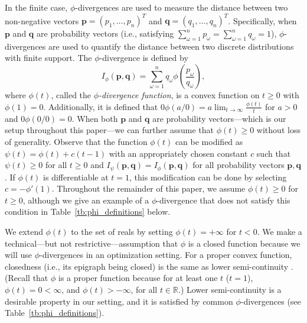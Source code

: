 \documentclass[opre,nonblindrev]{informs3} %
\newcommand{\q}{\mathbf{q}}
\newcommand{\p}{\mathbf{p}}
\begin{document}
In the finite case, $\phi$-divergences are used to measure the distance between two non-negative vectors $\p = (p_1, \dots, p_n)^T$ and $\q = (q_1, \dots, q_n)^T$.
Specifically, when $\p$ and $\q$ are probability vectors (i.e., satisfying $\sum_{\omega=1}^n p_\omega = \sum_{\omega=1}^n q_\omega = 1$), $\phi$-divergences are used to quantify the distance between two discrete distributions with finite support. 
The $\phi$-divergence is defined by
\[
	I_\phi(\p,\q) = \sum_{\omega=1}^n q_\omega \phi\left(\frac{p_\omega}{q_\omega}\right),
\]
where $\phi(t)$, called the {\it $\phi$-divergence function}, is a convex function on $t \geq 0$ with $\phi(1) = 0$.
Additionally, it is defined that $0 \phi(a/0) = a \lim_{t \rightarrow \infty} \frac{\phi(t)}{t}$ for $a>0$ and $0 \phi(0/0) = 0$.
When both $\p$ and $\q$ are probability vectors---which is our setup throughout this paper---we can further assume that $\phi(t) \geq 0$ without loss of generality. 
Observe that the function $\phi(t)$ can be modified as $\psi(t) = \phi(t) + c(t-1)$ with an appropriately chosen constant $c$ such that $\psi(t) \geq 0$ for all $t\geq 0$ and $I_\psi(\p,\q) = I_\phi(\p,\q)$ for all probability vectors $\p,\q$.
If $\phi(t)$ is differentiable at $t = 1$, this modification can be done by selecting $c = -\phi'(1)$.
Throughout the remainder of this paper, we assume $\phi(t) \geq 0$ for $t\geq 0$, although we give an example of a $\phi$-divergence that does not satisfy this condition in Table~\ref{tb:phi_definitions} below. 

We extend $\phi(t)$ to the set of reals by setting $\phi(t)=+\infty$ for $t<0$.
We make a technical---but not restrictive---assumption 
that $\phi$ is a closed function because we will use $\phi$-divergences in an optimization setting. 
For a proper convex function, closedness (i.e., its epigraph being closed) is the same as lower semi-continuity \citep{rockafellar_70}. 
(Recall that $\phi$ is a proper function because for at least one $t$ ($t=1$), $\phi(t)=0<\infty$, and $\phi(t)>-\infty$, for all $t\in\mathbb{R}$.)
Lower semi-continuity is a desirable property in our setting, and it is satisfied by common $\phi$-divergences (see Table~\ref{tb:phi_definitions}).
  
\end{document}

